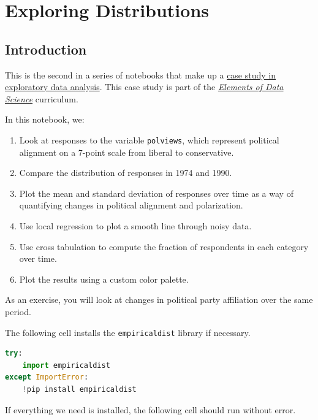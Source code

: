\hypertarget{exploring-distributions}{%
\chapter{Exploring Distributions}\label{exploring-distributions}}

\hypertarget{introduction}{%
\section{Introduction}\label{introduction}}

This is the second in a series of notebooks that make up a
\href{https://allendowney.github.io/PoliticalAlignmentCaseStudy/}{case
study in exploratory data analysis}. This case study is part of the
\href{https://allendowney.github.io/ElementsOfDataScience/}{\emph{Elements
of Data Science}} curriculum.

In this notebook, we:

\begin{enumerate}
\def\labelenumi{\arabic{enumi}.}
\item
  Look at responses to the variable \passthrough{\lstinline!polviews!},
  which represent political alignment on a 7-point scale from liberal to
  conservative.
\item
  Compare the distribution of responses in 1974 and 1990.
\item
  Plot the mean and standard deviation of responses over time as a way
  of quantifying changes in political alignment and polarization.
\item
  Use local regression to plot a smooth line through noisy data.
\item
  Use cross tabulation to compute the fraction of respondents in each
  category over time.
\item
  Plot the results using a custom color palette.
\end{enumerate}

As an exercise, you will look at changes in political party affiliation
over the same period.

The following cell installs the \passthrough{\lstinline!empiricaldist!}
library if necessary.

\begin{lstlisting}[language=Python]
try:
    import empiricaldist
except ImportError:
    !pip install empiricaldist
\end{lstlisting}

If everything we need is installed, the following cell should run
without error.

